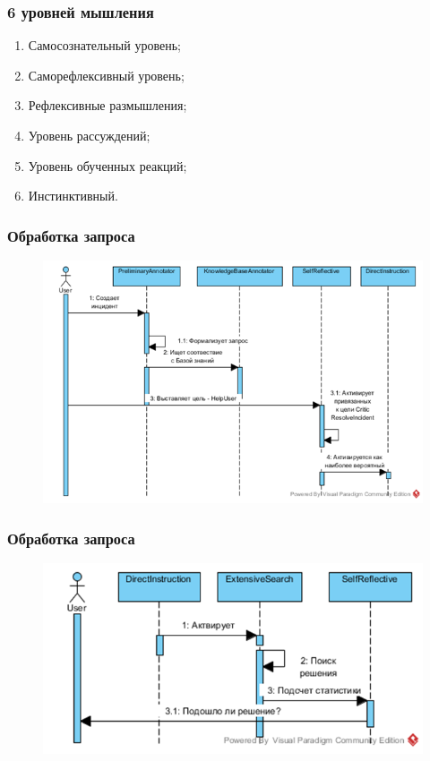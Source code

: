 \documentclass[14pt]{beamer}
\begin{document}
\begin{frame}
\frametitle{6 уровней мышления}
\begin{enumerate}
	\item Самосознательный уровень;
	\item Саморефлексивный уровень;
	\item Рефлексивные размышления;
	\item Уровень рассуждений;
	\item Уровень обученных реакций;
	\item Инстинктивный.
\end{enumerate}
\end{frame}

\begin{frame}
\frametitle{Обработка запроса}
\begin{figure} [h] 
	\center
	\includegraphics [scale=0.7] {RequestProcesssing}
	\label{img:RequestProcesssing}  
\end{figure}
\end{frame}

\begin{frame}
\frametitle{Обработка запроса}
\begin{figure} [h] 
	\center
	\includegraphics [scale=0.7] {RequestProcesssing2}
	\label{img:RequestProcesssing2}  
\end{figure}
\end{frame}
\end{document}
